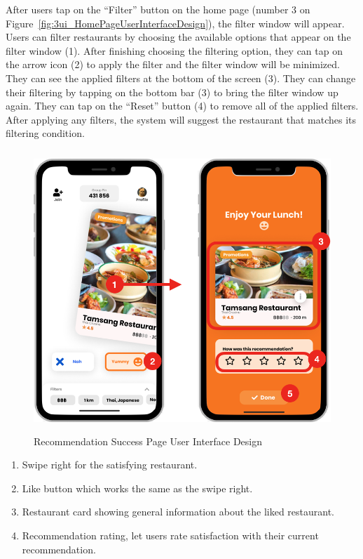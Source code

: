 \documentclass[12pt,oneside,openright,a4paper]{cpe-english-project}
\begin{document}
After users tap on the “Filter” button on the home page (number 3 on Figure~\ref{fig:3ui_HomePageUserInterfaceDesign}), the filter window will appear. Users can filter restaurants by choosing the available options that appear on the filter window (1). After finishing choosing the filtering option, they can tap on the arrow icon (2) to apply the filter and the filter window will be minimized. They can see the applied filters at the bottom of the screen (3). They can change their filtering by tapping on the bottom bar (3) to bring the filter window up again. They can tap on the “Reset” button (4) to remove all of the applied filters. After applying any filters, the system will suggest the restaurant that matches its filtering condition.

\newpage
\begin{figure}[H]\centering
\includegraphics[height=300pt]{./images/3ui_RecommendationSuccessPageUserInterfaceDesign.png}
\caption{Recommendation Success Page User Interface Design}\label{fig:3ui_RecommendationSuccessPageUserInterfaceDesign}
\end{figure}\vspace{-24pt}

\begin{enumerate}
\item Swipe right for the satisfying restaurant.
\item Like button which works the same as the swipe right.
\item Restaurant card showing general information about the liked restaurant.
\item Recommendation rating, let users rate satisfaction with their current recommendation.
\end{enumerate}
\end{document}
